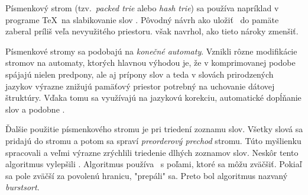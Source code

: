 Písmenkový strom (tzv.\ \emph{packed trie} alebo \emph{hash trie}) sa používa
napríklad v programe \TeX\ na slabikovanie slov \citep{liang}.
Pôvodný návrh \citep{fredkin} ako uložiť \trie\ do pamäte zaberal
príliš veľa nevyužitého priestoru. \citet{liang} však navrhol, ako
tieto nároky zmenšiť.

Písmenkové stromy sa podobajú na \emph{konečné automaty}. 
Vznikli rôzne modifikácie stromov na automaty, ktorých hlavnou výhodou je, 
že v komprimovanej podobe spájajú nielen predpony, ale aj prípony slov 
a teda v slovách prirodzených jazykov výrazne znižujú pamäťový priestor potrebný 
na uchovanie dátovej štruktúry. Vďaka tomu sa využívajú na jazykovú korekciu, 
automatické dopĺňanie slov a podobne \citep{scrabble,ca}. 

Ďalšie použitie písmenkového stromu je pri triedení zoznamu slov. 
Všetky slová sa pridajú do stromu a potom sa spraví \emph{preorderový prechod} 
stromu. Túto myšlienku spracovali \citet{burstsort1} a veľmi výrazne zrýchlili 
triedenie dlhých zoznamov slov. Neskôr tento algoritmus vylepšili 
\citet{burstsort2}. Algoritmus používa \trie\ s poľami, ktoré sa môžu zväčšiť. 
Pokiaľ sa pole zväčší za povolenú hranicu, "prepáli" sa. Preto bol 
algoritmus nazvaný \emph{burstsort}.



